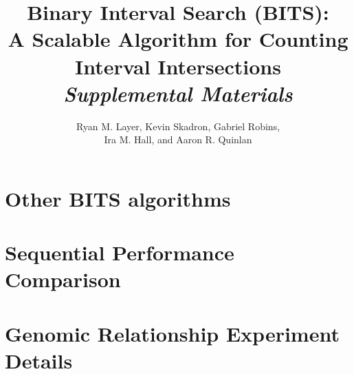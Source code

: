 \documentclass[12pt]{article}
\begin{document}
% 
% 

\title{Binary Interval Search (BITS):  \\
A Scalable Algorithm for Counting Interval Intersections \\
\emph{Supplemental Materials}}
\author{Ryan M. Layer, Kevin Skadron, Gabriel Robins, \\
        Ira M. Hall, and Aaron R. Quinlan}
\maketitle


\section{Other BITS algorithms}



\section{Sequential Performance Comparison}






\section{Genomic Relationship Experiment Details}

\end{document}
